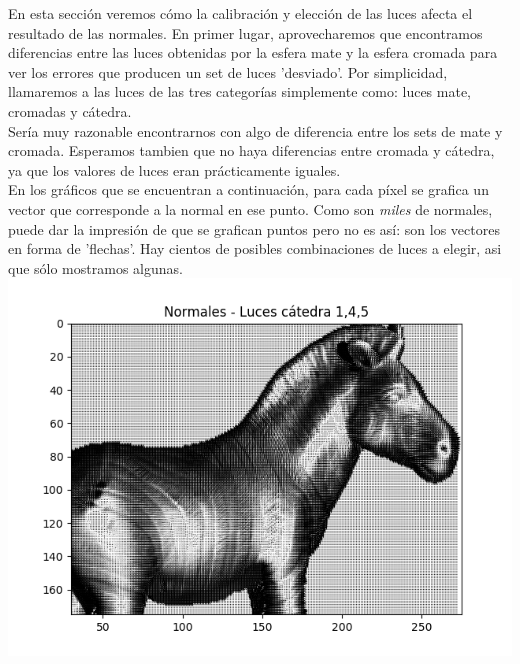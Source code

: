 En esta sección veremos cómo la calibración y elección de las luces afecta el resultado de las normales. En primer lugar, aprovecharemos que encontramos diferencias entre las luces obtenidas por la esfera mate y la esfera cromada para ver los errores que producen un set de luces 'desviado'. Por simplicidad, llamaremos a las luces de las tres categorías simplemente como: luces mate, cromadas y cátedra. \\

Sería muy razonable encontrarnos con algo de diferencia entre los sets de mate y cromada. Esperamos tambien que no haya diferencias entre cromada y cátedra, ya que los valores de luces eran prácticamente iguales. \\

En los gráficos que se encuentran a continuación, para cada píxel se grafica un vector que corresponde a la normal en ese punto. Como son \textit{miles} de normales, puede dar la impresión de que se grafican puntos pero no es así: son los vectores en forma de 'flechas'. Hay cientos de posibles combinaciones de luces a elegir, asi que sólo mostramos algunas. \\

{\centering
    \includegraphics[scale=0.5]{informe/imagenes/normales/normalesLucesCatedra145.png}
}

